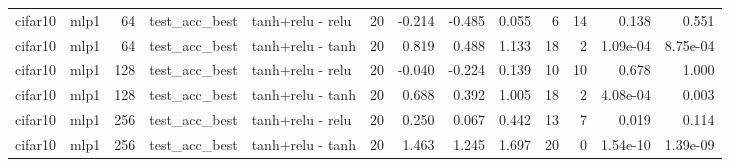 \begin{table}[htbp]
{\begin{tabular}{@{}llrllrrrrrrrr@{}}
cifar10 & mlp1 & 64 & test\_acc\_best & tanh+relu - relu & 20 & -0.214 & -0.485 & 0.055 & 6 & 14 & 0.138 & 0.551 \\
cifar10 & mlp1 & 64 & test\_acc\_best & tanh+relu - tanh & 20 & 0.819 & 0.488 & 1.133 & 18 & 2 & 1.09e-04 & 8.75e-04 \\
cifar10 & mlp1 & 128 & test\_acc\_best & tanh+relu - relu & 20 & -0.040 & -0.224 & 0.139 & 10 & 10 & 0.678 & 1.000 \\
cifar10 & mlp1 & 128 & test\_acc\_best & tanh+relu - tanh & 20 & 0.688 & 0.392 & 1.005 & 18 & 2 & 4.08e-04 & 0.003 \\
cifar10 & mlp1 & 256 & test\_acc\_best & tanh+relu - relu & 20 & 0.250 & 0.067 & 0.442 & 13 & 7 & 0.019 & 0.114 \\
cifar10 & mlp1 & 256 & test\_acc\_best & tanh+relu - tanh & 20 & 1.463 & 1.245 & 1.697 & 20 & 0 & 1.54e-10 & 1.39e-09 \\
\bottomrule
\end{tabular}}
\end{table}
